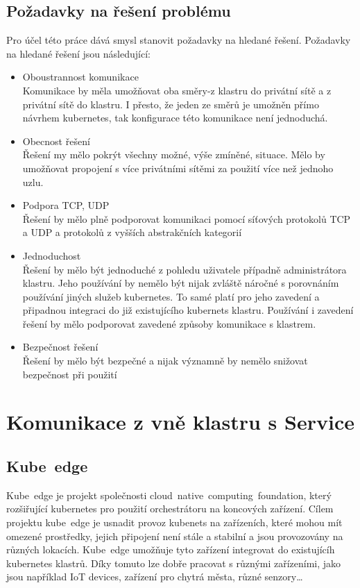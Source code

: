 \subsection{Požadavky na řešení problému}
Pro účel této práce dává smysl stanovit požadavky na hledané řešení. Požadavky na hledané řešení jsou následující:
\begin{itemize}
    \item Oboustrannost komunikace\\
    Komunikace by měla umožňovat oba směry-z klastru do privátní sítě a z privátní sítě do klastru. I přesto, že jeden ze směrů je umožněn přímo návrhem kubernetes, tak konfigurace této komunikace není jednoduchá. 
    \item Obecnost řešení\\
    Řešení my mělo pokrýt všechny možné, výše zmíněné, situace. Mělo by umožňovat propojení s více privátními sítěmi za použití více než jednoho uzlu.
    \item Podpora TCP, UDP\\
    Řešení by mělo plně podporovat komunikaci pomocí síťových protokolů TCP a UDP a protokolů z vyšších abstrakčních kategorií 
    \item Jednoduchost\\
    Řešení by mělo být jednoduché z pohledu uživatele případně administrátora klastru. Jeho používání by nemělo být nijak zvláště náročné s porovnáním používání jiných služeb kubernetes. To samé platí pro jeho zavedení a připadnou integraci do již existujícího kubernets klastru. Používání i zavedení řešení by mělo podporovat zavedené způsoby komunikace s klastrem.
    \item Bezpečnost řešení\\
    Řešení by mělo být bezpečné a nijak významně by nemělo snižovat bezpečnost při použití  
\end{itemize}
\noindent\makebox[\linewidth]{\rule{\paperwidth}{0.4pt}}

\section{Komunikace z vně klastru s Service}

\subsection{Kube~edge}
Kube~edge je projekt společnosti cloud~native~computing~foundation, který rozšiřující kubernetes pro použití orchestrátoru na koncových zařízení. Cílem projektu kube~edge je usnadit provoz kubenets na zařízeních, které mohou mít omezené prostředky, jejich připojení není stále a stabilní a jsou provozovány na různých lokacích. Kube~edge umožňuje tyto zařízení integrovat do existujícíh kubernetes klastrů. Díky tomuto lze dobře pracovat s různými zařízeními, jako jsou například IoT devices, zařízení pro chytrá města, různé senzory\ldots

